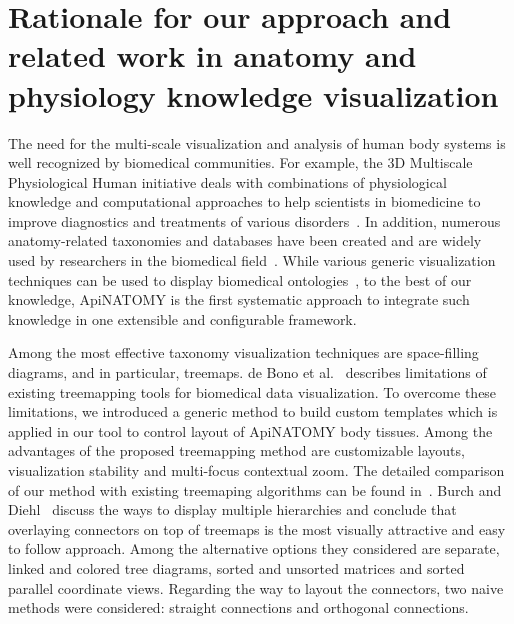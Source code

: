 \section{Rationale for our approach and related work in anatomy and physiology knowledge visualization} \label{sect:relatedWork}                                          %

The need for the multi-scale visualization and analysis of human body systems is well recognized by biomedical communities. For example, the 3D Multiscale Physiological Human initiative deals with combinations of physiological knowledge and computational approaches to help scientists in biomedicine to improve diagnostics and treatments of various disorders~\cite{MRC09,Mag09}. In addition, numerous anatomy-related taxonomies and databases have been created and are widely used by researchers in the biomedical field~\cite{BDB08}. While various generic visualization techniques can be used to display biomedical ontologies~\cite{KHL+07}, to the best of our knowledge, ApiNATOMY is the first systematic approach to integrate such knowledge in one extensible and configurable framework.

Among the most effective taxonomy visualization techniques are space-filling diagrams, and in particular, treemaps.
de Bono et al.~\cite{BGS12} describes limitations of existing treemapping tools for biomedical data visualization. To overcome these limitations, we introduced a generic method to build custom templates which is applied in our tool to control layout of ApiNATOMY body tissues. Among the advantages of the proposed treemapping method are customizable layouts, visualization stability and multi-focus contextual zoom. The detailed comparison of our method with existing treemaping algorithms can be found in~\cite{KBK14}.
Burch and Diehl~\cite{BD06} discuss the ways to display multiple hierarchies and conclude that overlaying connectors on top of treemaps is the most visually attractive and easy to follow approach. Among the alternative options they considered are separate, linked and colored tree diagrams, sorted and unsorted matrices and sorted parallel coordinate views. Regarding the way to layout the connectors, two naive methods were considered: straight connections and orthogonal connections. %

